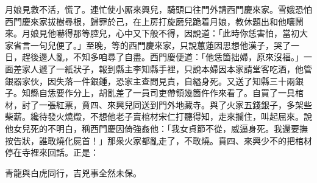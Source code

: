 月娘見救不活，慌了。連忙使小厮來興兒，騎頭口往門外請西門慶來家。雪娥恐怕西門慶來家拔樹尋根，歸罪於己，在上房打旋磨兒跪着月娘，教休題出和他嚷鬧來。月娘見他嚇得那等腔兒，心中又下般不得，因說道：「此時你恁害怕，當初大家省言一句兒便了。」至晚，等的西門慶來家，只說蕙蓮因思想他漢子，哭了一日，趕後邊人亂，不知多咱尋了自盡。西門慶便道：「他恁箇拙婦，原來沒福。」{}一面差家人遞了一紙狀子，報到縣主李知縣手裡，只說本婦因本家請堂客吃酒，他管銀器家伙，因失落一件銀鍾，恐家主查問見責，自縊身死。又送了知縣三十兩銀子。知縣自恁要作分上，胡亂差了一員司吏帶領幾箇仵作來看了。自買了一具棺材，討了一張紅票，賁四、來興兒同送到門外地藏寺。與了火家五錢銀子，多架些柴薪。纔待發火燒燬，不想他老子賣棺材宋仁打聽得知，走來攔住，叫起屈來。說他女兒死的不明白，稱西門慶因倚強姦他：「我女貞節不從，威逼身死。我還要撫按告狀，誰敢燒化屍首！」那衆火家都亂走了，不敢燒。賁四、來興少不的把棺材停在寺裡來回話。正是：

\begin{myquote}
青龍與白虎同行，吉兇事全然未保。
\end{myquote}

